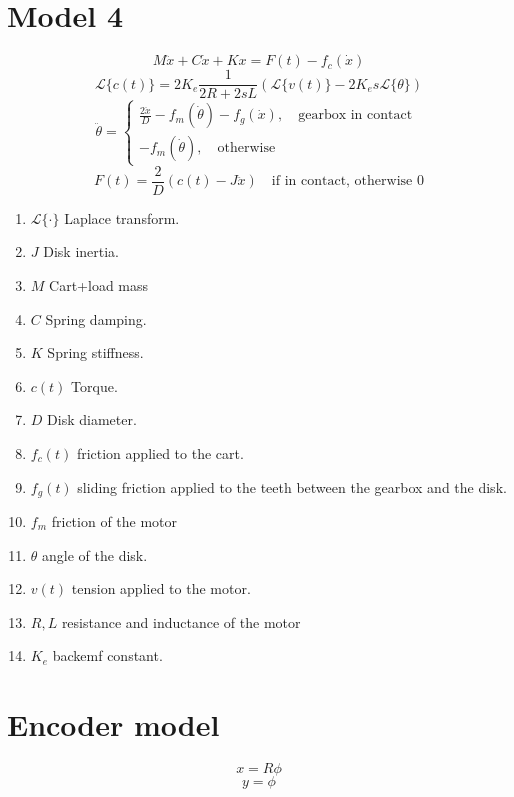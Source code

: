 \documentclass[10pt,a4paper]{report}
\begin{document}
\section{Model 4 }
$$M\ddot{x} + C\dot{x}+Kx = F(t) - f_c(\dot{x})$$
$$\mathcal{L}\{c(t)\} = 2K_e \frac{1}{2R+2sL} (\mathcal{L}\{ v(t)\}-2K_e s \mathcal{L}\{\theta \})$$
$$\ddot{\theta} = \begin{cases} 
\frac{2\ddot{x}}{D}-f_m(\dot{\theta})-f_g(\dot{x}), \quad \text{gearbox in contact }\\
-f_m(\dot{\theta}), \quad \text{otherwise}
\end{cases}$$
$$F(t) = \frac{2}{D}(c(t)-J\ddot{x}) \quad \text{if in contact, otherwise 0}$$
\begin{enumerate}
\item $\mathcal{L}\{\cdot \}$ Laplace transform.
\item $J$ Disk inertia.
\item $M$ Cart+load mass
\item $C$ Spring damping.
\item $K$ Spring stiffness.
\item $c(t)$ Torque.
\item $D$ Disk diameter.
\item $f_c(t)$ friction applied to the cart.
\item $f_g(t)$ sliding friction applied to the teeth between the gearbox and the disk.
\item $f_m$ friction of the motor
\item $\theta$ angle of the disk.
\item $v(t)$ tension applied to the motor.
\item $R,L$ resistance and inductance of the motor
\item $K_e$ backemf constant.

\end{enumerate}

\section{Encoder model}
$$x = R\phi$$
$$y =\phi$$
\end{document}
